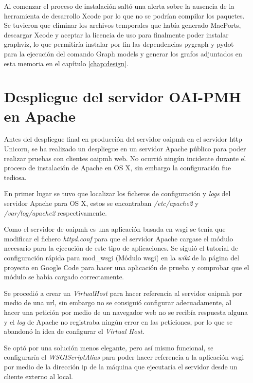 Al comenzar el proceso de instalación saltó una alerta sobre la ausencia de la herramienta de desarrollo Xcode\cite{Xcode} por lo que no se podrían compilar los paquetes. Se tuvieron que eliminar los archivos temporales que había generado MacPorts, descargar Xcode y aceptar la licencia de uso para finalmente poder instalar graphviz, lo que permitiría instalar por fin las dependencias pygraph y pydot para la ejecución del comando Graph models y generar los grafos adjuntados en esta memoria en el capítulo \ref{chap:design}.

\section{Despliegue del servidor OAI-PMH en Apache}

Antes del despliegue final en producción del servidor \acrshort{oaipmh} en el servidor \acrshort{http} Unicorn\cite{Unicorn}, se ha realizado un despliegue en un servidor Apache público para poder realizar pruebas con clientes \acrshort{oaipmh} web. No ocurrió ningún incidente durante el proceso de instalación de Apache en OS X, sin embargo la configuración fue tediosa.

En primer lugar se tuvo que localizar los ficheros de configuración y \textit{logs} del servidor Apache para OS X, estos se encontraban \textit{/etc/apache2} y \textit{/var/log/apache2} respectivamente.

Como el servidor de \acrshort{oaipmh} es una aplicación basada en \acrfull{wsgi} se tenía que modificar el fichero \textit{httpd.conf} para que el servidor Apache cargase el módulo necesario para la ejecución de este tipo de aplicaciones. Se siguió el tutorial de configuración rápida para mod\_wsgi (Módulo \acrshort{wsgi}) en la \textit{wiki} de la página del proyecto en Google Code\cite{GoogleCode} para hacer una aplicación de prueba y comprobar que el módulo se había cargado correctamente\cite{WSGI_tutorial}.

Se procedió a crear un \textit{VirtualHost} para hacer referencia al servidor \acrshort{oaipmh} por medio de una \acrshort{url}, sin embargo no se consiguió configurar adecuadamente, al hacer una petición por medio de un navegador web no se recibía respuesta alguna y el \textit{log} de Apache no registraba ningún error en las peticiones, por lo que se abandonó la idea de configurar el \textit{Virtual Host}.

Se optó por una solución menos elegante, pero así mismo funcional, se configuraría el \textit{WSGIScriptAlias} para poder hacer referencia a la aplicación \acrshort{wsgi} por medio de la dirección \acrshort{ip} de la máquina que ejecutaría el servidor desde un cliente externo al local.

